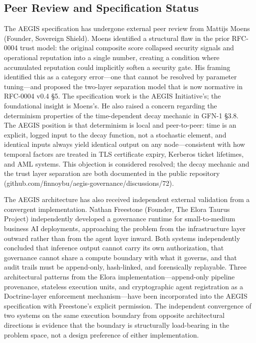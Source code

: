 \documentclass{IEEEcsmag}
\begin{document}
\subsection{Peer Review and Specification Status}

The AEGIS specification has undergone external peer review from Mattijs Moens (Founder, Sovereign Shield). Moens identified a structural flaw in the prior RFC-0004 trust model: the original composite score collapsed security signals and operational reputation into a single number, creating a condition where accumulated reputation could implicitly soften a security gate. His framing identified this as a category error---one that cannot be resolved by parameter tuning---and proposed the two-layer separation model that is now normative in RFC-0004 v0.4 \S5. The specification work is the AEGIS Initiative's; the foundational insight is Moens's. He also raised a concern regarding the determinism properties of the time-dependent decay mechanic in GFN-1 \S3.8. The AEGIS position is that determinism is local and peer-to-peer: time is an explicit, logged input to the decay function, not a stochastic element, and identical inputs always yield identical output on any node---consistent with how temporal factors are treated in TLS certificate expiry, Kerberos ticket lifetimes, and AML systems. This objection is considered resolved; the decay mechanic and the trust layer separation are both documented in the public repository (github.com/finnoybu/aegis-governance/discussions/72).

The AEGIS architecture has also received independent external validation from a convergent implementation. Nathan Freestone (Founder, The Elora Taurus Project) independently developed a governance runtime for small-to-medium business AI deployments, approaching the problem from the infrastructure layer outward rather than from the agent layer inward. Both systems independently concluded that inference output cannot carry its own authorization, that governance cannot share a compute boundary with what it governs, and that audit trails must be append-only, hash-linked, and forensically replayable. Three architectural patterns from the Elora implementation---append-only pipeline provenance, stateless execution units, and cryptographic agent registration as a Doctrine-layer enforcement mechanism---have been incorporated into the AEGIS specification with Freestone's explicit permission. The independent convergence of two systems on the same execution boundary from opposite architectural directions is evidence that the boundary is structurally load-bearing in the problem space, not a design preference of either implementation.
\end{document}
